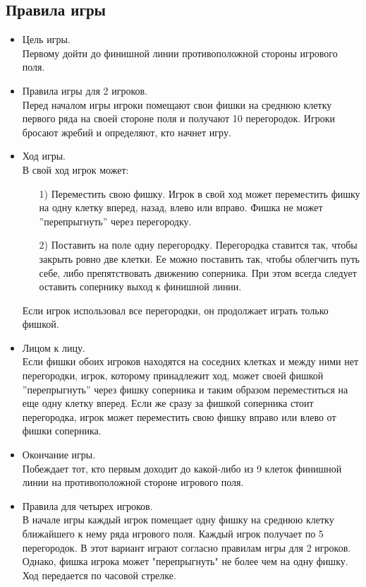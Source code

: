 \documentclass[a4paper]{article}
\begin{document}
\subsection{Правила игры}
\begin{itemize}
\item Цель игры.\\
Первому дойти до финишной линии противоположной стороны игрового поля.

\item Правила игры для 2 игроков.\\
Перед началом игры игроки помещают свои фишки на среднюю клетку первого ряда на своей стороне поля и получают 10 перегородок.  
Игроки бросают жребий и определяют, кто начнет игру.

\item Ход игры. \\
В свой ход игрок может:   
\begin{itemize}
\item[1)] Переместить свою фишку. Игрок в свой ход может переместить фишку на одну клетку вперед, назад, влево или вправо.
Фишка не может ''перепрыгнуть'' через перегородку.
\item[2)] Поставить на поле одну перегородку. Перегородка ставится так, чтобы закрыть ровно две клетки. Ее можно поставить так, чтобы облегчить путь себе, либо препятствовать движению соперника. При этом всегда следует оставить сопернику выход к финишной линии.
\end{itemize}
Если игрок использовал все перегородки, он продолжает играть только фишкой.

\item Лицом к лицу. \\
Если фишки обоих игроков находятся на соседних клетках и между ними нет перегородки, игрок, которому принадлежит ход, может своей фишкой ''перепрыгнуть'' через фишку соперника и таким образом переместиться на еще одну клетку вперед. 
Если же сразу за фишкой соперника стоит перегородка, игрок может переместить свою фишку вправо или влево от фишки соперника. 

\item Окончание игры. \\
Побеждает тот, кто первым доходит до какой-либо из 9 клеток финишной линии на противоположной стороне игрового поля.

\item Правила для четырех игроков. \\
В начале игры каждый игрок помещает одну фишку на среднюю клетку ближайшего к нему ряда игрового поля. Каждый игрок получает по 5 перегородок. В этот вариант играют согласно правилам игры для 2 игроков. Однако, фишка игрока может "перепрыгнуть" не более чем на одну фишку. Ход передается по часовой стрелке.


\end{itemize}
\end{document}

